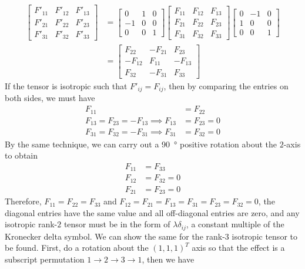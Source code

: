 \begin{align}
\begin{bmatrix}
F'_{11} & F'_{12} & F'_{13} \\
F'_{21} & F'_{22} & F'_{23} \\
F'_{31} & F'_{32} & F'_{33}  
\end{bmatrix} &= 
\begin{bmatrix}
0 & 1 & 0 \\
-1 & 0 & 0 \\
0 & 0 & 1
\end{bmatrix}
\begin{bmatrix}
F_{11} & F_{12} & F_{13} \\
F_{21} & F_{22} & F_{23} \\
F_{31} & F_{32} & F_{33}  
\end{bmatrix} 
\begin{bmatrix}
0 & -1 & 0 \\
1 & 0 & 0 \\
0 & 0 & 1
\end{bmatrix} \nonumber \\
&= \begin{bmatrix}
F_{22} & -F_{21} & F_{23} \\
-F_{12} & F_{11} & -F_{13} \\
F_{32} & -F_{31} & F_{33}
\end{bmatrix}
\end{align}
If the tensor is isotropic such that $F'_{ij} = F_{ij}$, then by comparing the entries on both sides, we must have
\begin{subequations}
\begin{align}
F_{11} &= F_{22} \\
F_{13} = F_{23} = -F_{13} \implies F_{13} &= F_{23} = 0 \\
F_{31} = F_{32} = -F_{31} \implies F_{31} &= F_{32} = 0 
\end{align}
\end{subequations}
By the same technique, we can carry out a \SI{90}{\degree} positive rotation about the $2$-axis to obtain
\begin{subequations}
\begin{align}
F_{11} &= F_{33} \\
F_{12} &= F_{32} = 0 \\
F_{21} &= F_{23} = 0 
\end{align}
\end{subequations}
Therefore, $F_{11} = F_{22} = F_{33}$ and $F_{12} = F_{21} = F_{13} = F_{31} = F_{23} = F_{32} = 0$, the diagonal entries have the same value and all off-diagonal entries are zero, and any isotropic rank-$2$ tensor must be in the form of $\lambda \delta_{ij}$, a constant multiple of the Kronecker delta symbol. We can show the same for the rank-$3$ isotropic tensor to be found. First, do a rotation about the $(1,1,1)^T$ axis so that the effect is a subscript permutation $1 \to 2 \to 3 \to 1$, then we have
